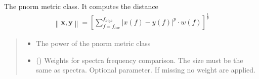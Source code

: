 \documentclass[letterpaper,10pt,english]{sphinxmanual}
\begin{document}
\begin{fulllineitems}
\label{\detokenize{api_support:amw.mw.parameters.PNormMetric}}
\pysigstartsignatures
{}
\pysigstopsignatures
\sphinxAtStartPar
The p\sphinxhyphen{}norm metric class. It computes the distance
\begin{equation*}
\begin{split}\left\| \textbf{x},\textbf{y} \right\|=
\left[\sum_{f=f_{low}}^{f_{high}}{\left|x\left(f\right)-y\left(f\right)\right|^p\cdot
w\left(f\right)}\right]^\frac{1}{p}\end{split}
\end{equation*}\begin{quote}\begin{description}
\begin{itemize}
\item {} 
\sphinxAtStartPar
{} \textendash{} The power of the p\sphinxhyphen{}norm metric class

\item {} 
\sphinxAtStartPar
{} (\sphinxstyleliteralemphasis{\sphinxupquote{(}}\sphinxstyleliteralemphasis{\sphinxupquote{)}}) \textendash{} Weights for spectra frequency comparison. The size must be the same as spectra.
Optional parameter. If missing no weight are applied.

\end{itemize}

\end{description}\end{quote}

\end{fulllineitems}

\end{document}
